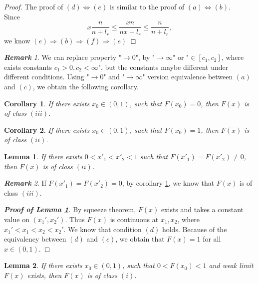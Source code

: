 \documentclass[12pt]{article}
\theoremstyle{plain}
\newtheorem{lem}{\textbf{Lemma}}
\newtheorem{cor}{\textbf{Corollary}}
\theoremstyle{definition}
\theoremstyle{remark}
\newtheorem{rem}{\textbf{Remark}}
\begin{document}
\begin{proof}
    The proof of $(d)\Leftrightarrow(e)$ is similar to the proof of $(a)\Leftrightarrow(b)$. \\
    Since
    \begin{equation*}
x\dfrac{n}{n+l_r}\leq \dfrac{xn}{nx+l_r}\leq \dfrac{n}{n+l_r},
    \end{equation*}
we know $(e)\Rightarrow (b)\Rightarrow (f)\Rightarrow (e)$
\end{proof}
\begin{rem}\label{rem6}
    We can replace property "$\to 0$", by "$\to \infty$"  or  "$\in [c_1,c_2] $, where exists constants $c_1>0, c_2<\infty$", but the constants maybe different under different conditions. Using "$\to 0$" and "$\to \infty$" version equivalence between $(a)$ and $(c)$, we obtain the following corollary.
\end{rem}
\begin{cor}\label{corollary1}
If there exists $x_0\in (0,1)$, such that $F(x_0)=0$, then $F(x)$ is of class $(iii)$.
\end{cor}
\begin{cor}
    If there exists $x_0\in (0,1)$, such that $F(x_0)=1$, then $F(x)$ is of class $(ii)$.
\end{cor}

\begin{lem}\label{lem4_new}
    If there exists $0<x'_{1}<x'_{2}<1$ such that $F(x'_1)=F(x'_2)\neq 0$, then $F(x)$ is of class $(ii)$.
\end{lem}
\begin{rem}\label{rem7_new}
    If $F(x'_1)=F(x'_2)=0$, by corollary \ref{corollary1}, we know that $F(x)$ is of class $(iii)$.\\
\end{rem}
\begin{proof}[\textit{\textbf{Proof of Lemma \ref{lem4_new}}}]
    By squeeze theorem, $F(x)$ exists and takes a constant value on $(x_1',x_2')$. Thus $F(x)$  is continuous at $x_1,x_2$, where $x_1'<x_1<x_2<x_2'$. We know that condition $(d)$ holds. Because of the equivalency between $(d)$ and $(c)$, we obtain that $F(x)=1$ for all $x \in(0,1)$.
\end{proof}
\begin{lem}
If there exists $x_0\in (0,1)$, such that $0<F(x_0)<1$ and weak limit $F(x)$ exists, then $F(x)$ is of class $(i)$.
\end{lem}
\end{document}
